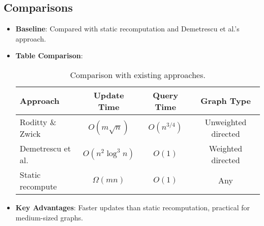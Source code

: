 \documentclass[11pt]{article}
\begin{document}
\subsection{Comparisons}
\begin{itemize}
    \item \textbf{Baseline}: Compared with static recomputation and Demetrescu et al.’s approach.
    \item \textbf{Table Comparison}:
    \begin{table}[h]
        \centering
        \begin{tabular}{lccc}
            \toprule
            Approach & Update Time & Query Time & Graph Type \\
            \midrule
            Roditty \& Zwick & $O(m \sqrt{n})$ & $O(n^{3/4})$ & Unweighted directed \\
            Demetrescu et al. & $O(n^2 \log^3 n)$ & $O(1)$ & Weighted directed \\
            Static recompute & $\Omega(mn)$ & $O(1)$ & Any \\
            \bottomrule
        \end{tabular}
        \caption{Comparison with existing approaches.}
    \end{table}
    \item \textbf{Key Advantages}: Faster updates than static recomputation, practical for medium-sized graphs.
\end{itemize}
\end{document}
